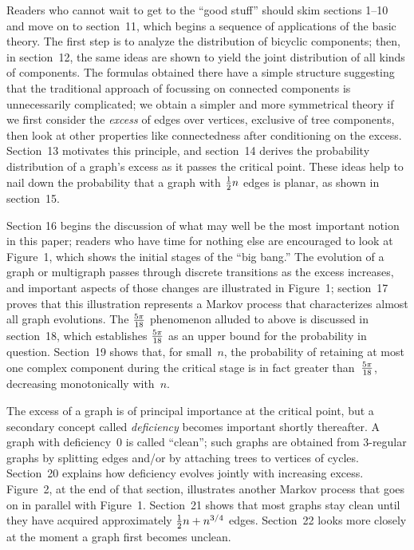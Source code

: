 Readers who cannot wait to get to the ``good stuff'' should skim sections 1--10
and move on to section~11, which begins a sequence of applications of the
basic theory. The first step is to analyze the distribution of bicyclic
components; then, in section~12, the same ideas are shown to yield the
joint distribution of all kinds of components. The formulas obtained there
have a simple structure suggesting that the traditional approach of focussing
on connected components is unnecessarily complicated; we obtain a simpler
and more symmetrical theory if we first  consider the {\it excess\/} of edges
over vertices, exclusive of tree components, then look at other properties
like connectedness after conditioning on the excess. Section~13 motivates
this principle, and section~14 derives the probability distribution of a
graph's excess as it passes the critical point. These ideas help to
nail down the probability that a graph with ${1\over2} n$ edges is planar,
as shown in section~15.

Section 16 begins the discussion of what may well be the most important
notion in this paper; readers who have time for nothing else are
encouraged to look at Figure~1, which shows the initial stages of the
``big bang.'' The evolution of a graph or multigraph passes through
discrete transitions as the excess increases, and important aspects
of those changes are illustrated in Figure~1; section~17 proves that
this illustration represents a Markov process that characterizes almost
all graph evolutions. The ${5\pi\over18}$ phenomenon alluded to above
is discussed in section~18, which establishes $5\pi\over18$ as an
upper bound for the probability in question. Section~19 shows that, for
small~$n$, the probability of retaining at most one complex component
during the critical stage is in fact greater than~$5\pi\over18$, decreasing
monotonically with~$n$.

The excess of a graph is of principal importance at the critical point, but
a secondary concept called {\it deficiency\/} becomes important shortly
thereafter. A graph with deficiency~0 is called ``clean''; such graphs
are obtained from 3-regular graphs by splitting edges and/or by attaching
trees to vertices of cycles. Section~20 explains how deficiency evolves
jointly with increasing excess. Figure~2, at the end of that section,
illustrates another Markov process that goes on in parallel with
Figure~1. Section~21 shows that most graphs stay
clean until they have acquired approximately ${1\over2} n+n^{3/4}$ edges.
Section~22 looks more closely at the moment a graph first becomes unclean.

